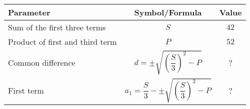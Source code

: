 \begin{tabular}{|l|c|c|}

\hline
\textbf{Parameter} & \textbf{Symbol/Formula} & \textbf{Value} \\
\hline
Sum of the first three terms & $S$ & $42$ \\
\hline
Product of first and third term & $P$ & $52$ \\
\hline
Common difference & $d = \pm \sqrt{\left(\dfrac{S}{3} \right)^2 - P}$ & ? \\
\hline
First term & $a_1 = \dfrac{S}{3} - \pm \sqrt{\left(\dfrac{S}{3} \right)^2 - P}$ & ? \\
\hline
\end{tabular}
